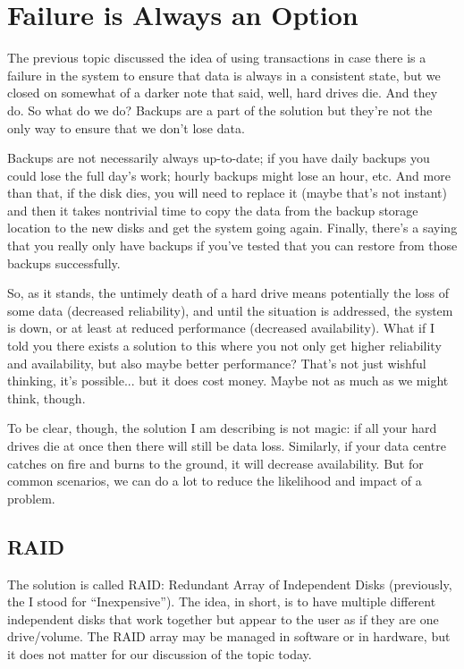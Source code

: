 




\section*{Failure is Always an Option}

The previous topic discussed the idea of using transactions in case there is a failure in the system to ensure that data is always in a consistent state, but we closed on somewhat of a darker note that said, well, hard drives die. And they do. So what do we do? Backups are a part of the solution but they're not the only way to ensure that we don't lose data.

Backups are not necessarily always up-to-date; if you have daily backups you could lose the full day's work; hourly backups might lose an hour, etc. And more than that, if the disk dies, you will need to replace it (maybe that's not instant) and then it takes nontrivial time to copy the data from the backup storage location to the new disks and get the system going again. Finally, there's a saying that you really only have backups if you've tested that you can restore from those backups successfully. 

So, as it stands, the untimely death of a hard drive means potentially the loss of some data (decreased reliability), and until the situation is addressed, the system is down, or at least at reduced performance (decreased availability). What if I told you there exists a solution to this where you not only get higher reliability and availability, but also maybe better performance? That's not just wishful thinking, it's possible... but it does cost money. Maybe not as much as we might think, though.

To be clear, though, the solution I am describing is not magic: if all your hard drives die at once then there will still be data loss. Similarly, if your data centre catches on fire and burns to the ground, it will decrease availability. But for common scenarios, we can do a lot to reduce the likelihood and impact of a problem.

\subsection*{RAID}
The solution is called RAID: Redundant Array of Independent Disks (previously, the I stood for ``Inexpensive''). The idea, in short, is to have multiple different independent disks that work together but appear to the user as if they are one drive/volume. The RAID array may be managed in software or in hardware, but it does not matter for our discussion of the topic today. 

